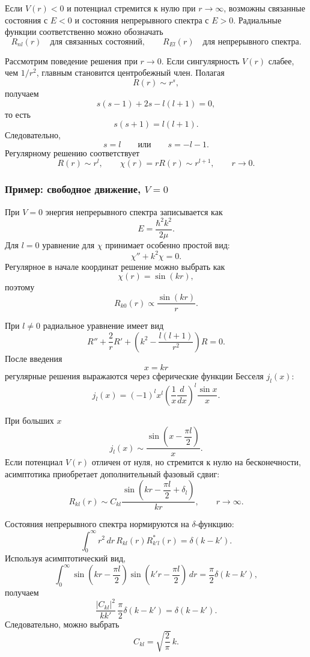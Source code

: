 \documentclass[12pt,a4paper]{article}
\begin{document}
Если $V(r)<0$ и потенциал стремится к нулю при $r\to\infty$, возможны
связанные состояния с $E<0$ и состояния непрерывного спектра с $E>0$.
Радиальные функции соответственно можно обозначать
\[
    R_{nl}(r)
    \quad\text{для связанных состояний},
    \qquad
    R_{El}(r)
    \quad\text{для непрерывного спектра}.
\]

Рассмотрим поведение решения при $r\to0$. Если сингулярность $V(r)$
слабее, чем $1/r^2$, главным становится центробежный член. Полагая
\[
    R(r)\sim r^s,
\]
получаем
\[
    s(s-1)+2s-l(l+1)=0,
\]
то есть
\[
    s(s+1)=l(l+1).
\]
Следовательно,
\[
    s=l
    \qquad\text{или}\qquad
    s=-l-1.
\]
Регулярному решению соответствует
\[
    \boxed{
        R(r)\sim r^l,
        \qquad
        \chi(r)=rR(r)\sim r^{l+1},
        \qquad
        r\to0
    }.
\]


\subsubsection{Пример: свободное движение, \texorpdfstring{$V=0$}{V=0}}

При $V=0$ энергия непрерывного спектра записывается как
\[
    \boxed{
        E=\frac{\hbar^2k^2}{2\mu}
    }.
\]
Для $l=0$ уравнение для $\chi$ принимает особенно простой вид:
\[
    \chi''+k^2\chi=0.
\]
Регулярное в начале координат решение можно выбрать как
\[
    \chi(r)=\sin(kr),
\]
поэтому
\[
    R_{k0}(r)\propto\frac{\sin(kr)}{r}.
\]

При $l\neq0$ радиальное уравнение имеет вид
\[
    R''+\frac{2}{r}R'
    +
    \left(
        k^2-\frac{l(l+1)}{r^2}
    \right)R
    =
    0.
\]
После введения
\[
    x=kr
\]
регулярные решения выражаются через сферические функции Бесселя
$j_l(x)$:
\[
    \boxed{
    j_l(x)
    =
    (-1)^l x^l
    \left(
        \frac{1}{x}\frac{d}{dx}
    \right)^l
    \frac{\sin x}{x}
    }.
\]

При больших $x$
\[
    \boxed{
        j_l(x)
        \sim
        \frac{
            \sin\left(x-\dfrac{\pi l}{2}\right)
        }{x}
    }.
\]
Если потенциал $V(r)$ отличен от нуля, но стремится к нулю на
бесконечности, асимптотика приобретает дополнительный фазовый сдвиг:
\[
    \boxed{
        R_{kl}(r)
        \sim
        C_{kl}
        \frac{
            \sin\left(
                kr-\dfrac{\pi l}{2}+\delta_l
            \right)
        }{kr}
    },
    \qquad
    r\to\infty.
\]

Состояния непрерывного спектра нормируются на $\delta$-функцию:
\[
    \boxed{
    \int_0^\infty
        r^2\,dr\,
        R_{kl}(r)R_{k'l}^*(r)
    =
    \delta(k-k')
    }.
\]
Используя асимптотический вид,
\[
    \int_0^\infty
    \sin\left(kr-\frac{\pi l}{2}\right)
    \sin\left(k'r-\frac{\pi l}{2}\right)\,dr
    =
    \frac{\pi}{2}\delta(k-k'),
\]
получаем
\[
    \frac{|C_{kl}|^2}{kk'}\,
    \frac{\pi}{2}\delta(k-k')
    =
    \delta(k-k').
\]
Следовательно, можно выбрать
\[
    \boxed{
        C_{kl}
        =
        \sqrt{\frac{2}{\pi}}\,k
    }.
\]
\end{document}

